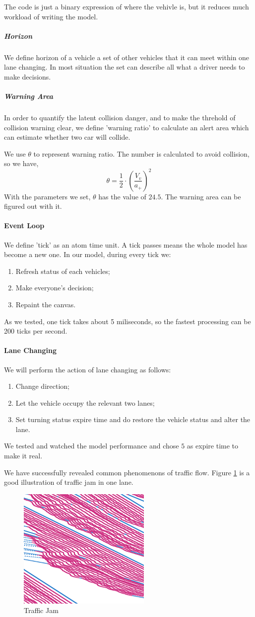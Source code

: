 The code is just a binary expression of where the vehivle is, but it reduces much workload of writing the model. 

\subparagraph{Horizon}
We define horizon of a vehicle a set of other vehicles that it can meet within one lane changing. 
In most situation the set can describe all what a driver needs to make decisions.

\subparagraph{Warning Area}
In order to quantify the latent collision danger, and to make the threhold of collision warning clear, we define 'warning ratio' to calculate an alert area which can estimate whether two car will collide. 

We use $\theta$ to represent warning ratio. The number is calculated to avoid collision, so we have,  
\[
\theta=\frac{1}{2}\cdot\left(\frac{V_v}{a_+}\right)^2
\]
With the parameters we set, $\theta$ has the value of $24.5$. 
The warning area can be figured out with it. 

\paragraph{Event Loop}
We define 'tick' as an atom time unit. 
A tick passes means the whole model has become a new one. 
In our model, during every tick we: 
\begin{enumerate}
\item Refresh status of each vehicles; 
\item Make everyone's decision; 
\item Repaint the canvas. 
\end{enumerate}
As we tested, one tick takes about 5 miliseconds, so the fastest processing can be 200 ticks per second.  

\paragraph{Lane Changing}
We will perform the action of lane changing as follows: 
\begin{enumerate}
\item Change direction; 
\item Let the vehicle occupy the relevant two lanes;
\item Set turning status expire time and do restore the vehicle status and alter the lane.
\end{enumerate}
We tested and watched the model performance and chose $5$ as expire time to make it real.

We have successfully revealed common phenomenons of traffic flow. 
Figure \ref{fig:jam} is a good illustration of traffic jam in one lane.
\begin{figure}[H]
  \centering
  \includegraphics[width=.3\textwidth]{./img/jam.png}
  \caption{Traffic Jam}
  \label{fig:jam}
\end{figure}

